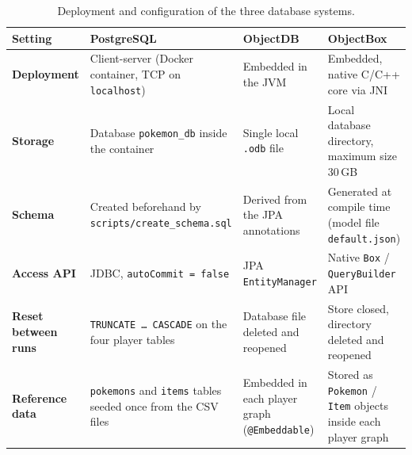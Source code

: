 \documentclass{article}
\begin{document}
\begin{table}[H]
    \centering
    \small
    \begin{tabularx}{\textwidth}{>{\RaggedRight\bfseries}p{3.0cm} L L L}
        \toprule
        \textbf{Setting}        & \textbf{PostgreSQL}                                                      & \textbf{ObjectDB}                                                     & \textbf{ObjectBox}                                                          \\
        \midrule
        Deployment              & Client-server (Docker container, TCP on \texttt{localhost})              & Embedded in the JVM                                                   & Embedded, native C/C++ core via JNI                                         \\
        \addlinespace[3pt]
        Storage                 & Database \texttt{pokemon\_db} inside the container                       & Single local \texttt{.odb} file                                       & Local database directory, maximum size 30\,GB                               \\
        \addlinespace[3pt]
        Schema                  & Created beforehand by \texttt{scripts/create\_schema.sql}                & Derived from the JPA annotations                                      & Generated at compile time (model file \texttt{default.json})                \\
        \addlinespace[3pt]
        Access API              & JDBC, \texttt{autoCommit = false}                                        & JPA \texttt{EntityManager}                                            & Native \texttt{Box} / \texttt{QueryBuilder} API                              \\
        \addlinespace[3pt]
        Reset between runs      & \texttt{TRUNCATE \dots\ CASCADE} on the four player tables              & Database file deleted and reopened                                    & Store closed, directory deleted and reopened                         \\
        \addlinespace[3pt]
        Reference data          & \texttt{pokemons} and \texttt{items} tables seeded once from the CSV files & Embedded in each player graph (\texttt{@Embeddable})                 & Stored as \texttt{Pokemon} / \texttt{Item} objects inside each player graph \\
        \bottomrule
    \end{tabularx}
    \caption{Deployment and configuration of the three database systems.}
    \label{tab:deployment}
\end{table}
\end{document}

